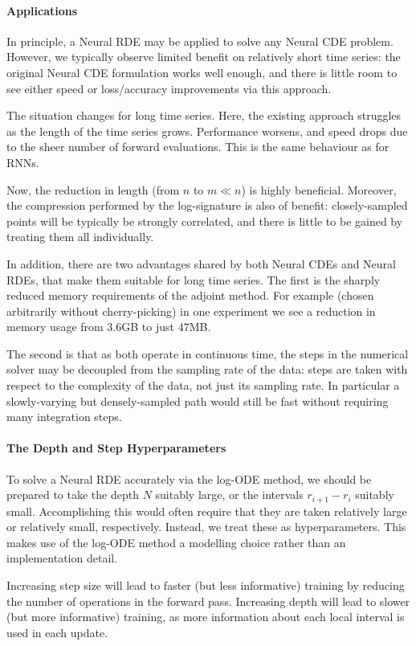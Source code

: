 \documentclass{article}
\begin{document}
\paragraph{Applications} In principle, a Neural RDE may be applied to solve any Neural CDE problem. However, we typically observe limited benefit on relatively short time series: the original Neural CDE formulation works well enough, and there is little room to see either speed or loss/accuracy improvements via this approach.

The situation changes for long time series. Here, the existing approach struggles as the length of the time series grows. Performance worsens, and speed drops due to the sheer number of forward evaluations. This is the same behaviour as for RNNs.

Now, the reduction in length (from $n$ to $m \ll n$) is highly beneficial. Moreover, the compression performed by the log-signature is also of benefit: closely-sampled points will be typically be strongly correlated, and there is little to be gained by treating them all individually.

In addition, there are two advantages shared by both Neural CDEs and Neural RDEs, that make them suitable for long time series. The first is the sharply reduced memory requirements of the adjoint method. For example (chosen arbitrarily without cherry-picking) in one experiment we see a reduction in memory usage from $3.6$GB to just $47$MB.

The second is that as both operate in continuous time, the steps in the numerical solver may be decoupled from the sampling rate of the data: steps are taken with respect to the complexity of the data, not just its sampling rate. In particular a slowly-varying but densely-sampled path would still be fast without requiring many integration steps.

\paragraph{The Depth and Step Hyperparameters}To solve a Neural RDE accurately via the log-ODE method, we should be prepared to take the depth $N$ suitably large, or the intervals $r_{i + 1} - r_i$ suitably small. Accomplishing this would often require that they are taken relatively large or relatively small, respectively. Instead, we treat these as hyperparameters. This makes use of the log-ODE method a modelling choice rather than an implementation detail.

Increasing step size will lead to faster (but less informative) training by reducing the number of operations in the forward pass. Increasing depth will lead to slower (but more informative) training, as more information about each local interval is used in each update.
\end{document}
